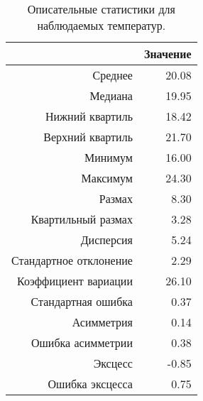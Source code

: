 \begin{table}[ht]
\centering
\begin{tabular}{rr}
  \hline
 & Значение \\ 
  \hline
Среднее & 20.08 \\ 
  Медиана & 19.95 \\ 
  Нижний квартиль & 18.42 \\ 
  Верхний квартиль & 21.70 \\ 
  Минимум & 16.00 \\ 
  Максимум & 24.30 \\ 
  Размах & 8.30 \\ 
  Квартильный размах & 3.28 \\ 
  Дисперсия & 5.24 \\ 
  Стандартное отклонение & 2.29 \\ 
  Коэффициент вариации & 26.10 \\ 
  Стандартная ошибка & 0.37 \\ 
  Асимметрия & 0.14 \\ 
  Ошибка асимметрии & 0.38 \\ 
  Эксцесс & -0.85 \\ 
  Ошибка эксцесса & 0.75 \\ 
   \hline
\end{tabular}
\caption{Описательные статистики для наблюдаемых температур.} 
\label{table:dstats}
\end{table}
